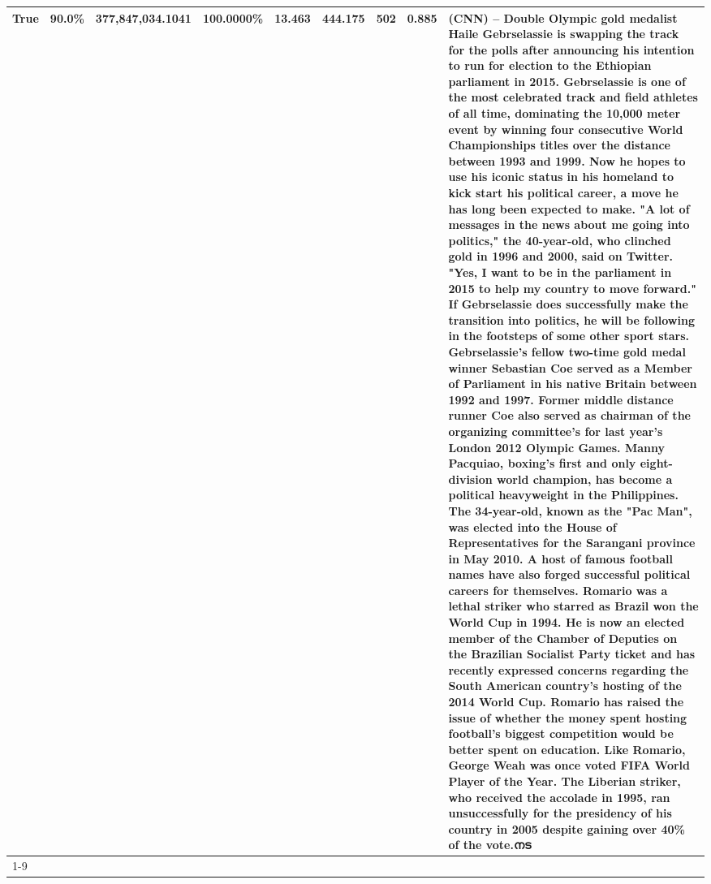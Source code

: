 \begin{table}[H]
{\begin{tabular}{lllrlllll}
True & 90.0\% & 377,847,034.1041 & \bfseries \color{red} 100.0000\% & 13.463 & 444.175 & 502 & 0.885 & (CNN) -- Double Olympic gold medalist Haile Gebrselassie is swapping the track for the polls after announcing his intention to run for election to the Ethiopian parliament in 2015. Gebrselassie is one of the most celebrated track and field athletes of all time, dominating the 10,000 meter event by winning four consecutive World Championships titles over the distance between 1993 and 1999. Now he hopes to use his iconic status in his homeland to kick start his political career, a move he has long been expected to make. "A lot of messages in the news about me going into politics," the 40-year-old, who clinched gold in 1996 and 2000, said on Twitter. "Yes, I want to be in the parliament in 2015 to help my country to move forward." If Gebrselassie does successfully make the transition into politics, he will be following in the footsteps of some other sport stars. Gebrselassie's fellow two-time gold medal winner Sebastian Coe served as a Member of Parliament in his native Britain between 1992 and 1997. Former middle distance runner Coe also served as chairman of the organizing committee's for last year's London 2012 Olympic Games. Manny Pacquiao, boxing's first and only eight-division world champion, has become a political heavyweight in the Philippines. The 34-year-old, known as the "Pac Man", was elected into the House of Representatives for the Sarangani province in May 2010. A host of famous football names have also forged successful political careers for themselves. Romario was a lethal striker who starred as Brazil won the World Cup in 1994. He is now an elected member of the Chamber of Deputies on the Brazilian Socialist Party ticket and has recently expressed concerns regarding the South American country's hosting of the 2014 World Cup. Romario has raised the issue of whether the money spent hosting football's biggest competition would be better spent on education. Like Romario, George Weah was once voted FIFA World Player of the Year. The Liberian striker, who received the accolade in 1995, ran unsuccessfully for the presidency of his country in 2005 despite gaining over 40\% of the vote.നട \\
\cline{1-9}

\end{tabular}}
\end{table}

